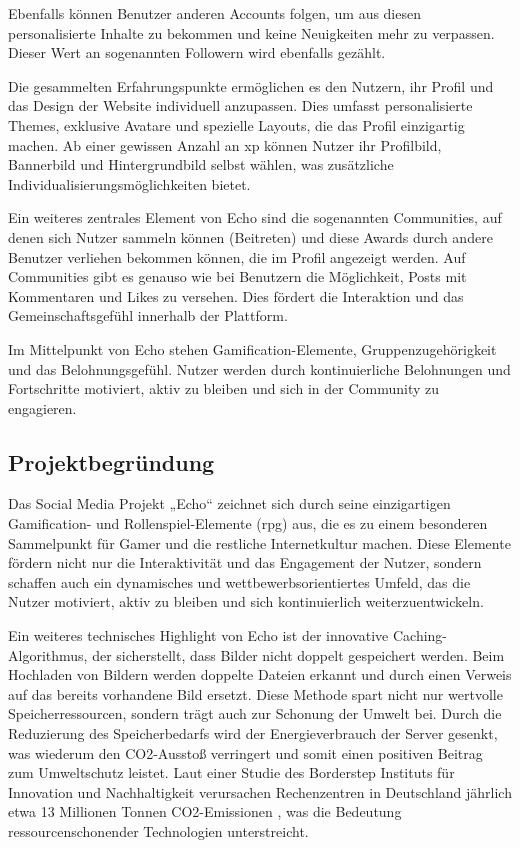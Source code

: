\documentclass[a4paper,12pt]{article}
\begin{document}
Ebenfalls können Benutzer anderen Accounts folgen, um aus diesen
personalisierte Inhalte zu bekommen und keine Neuigkeiten mehr zu verpassen.
Dieser Wert an sogenannten Followern wird ebenfalls gezählt.

Die gesammelten Erfahrungspunkte ermöglichen es den Nutzern, ihr Profil und das
Design der Website individuell anzupassen. Dies umfasst personalisierte Themes,
exklusive Avatare und spezielle Layouts, die das Profil einzigartig machen. Ab
einer gewissen Anzahl an \gls{xp} können Nutzer ihr Profilbild, Bannerbild und
Hintergrundbild selbst wählen, was zusätzliche Individualisierungsmöglichkeiten
bietet.

Ein weiteres zentrales Element von Echo sind die sogenannten Communities, auf
denen sich Nutzer sammeln können (Beitreten) und diese Awards durch andere
Benutzer verliehen bekommen können, die im Profil angezeigt werden. Auf
Communities gibt es genauso wie bei Benutzern die Möglichkeit, Posts mit
Kommentaren und Likes zu versehen. Dies fördert die Interaktion und das
Gemeinschaftsgefühl innerhalb der Plattform.

Im Mittelpunkt von Echo stehen Gamification-Elemente, Gruppenzugehörigkeit und
das Belohnungsgefühl. Nutzer werden durch kontinuierliche Belohnungen und
Fortschritte motiviert, aktiv zu bleiben und sich in der Community zu
engagieren.

\newpage
\subsection{Projektbegründung}
Das Social Media Projekt „Echo“ zeichnet sich durch seine einzigartigen
Gamification- und Rollenspiel-Elemente (\gls{rpg}) aus, die es zu einem
besonderen Sammelpunkt für Gamer und die restliche Internetkultur machen. Diese
Elemente fördern nicht nur die Interaktivität und das Engagement der Nutzer,
sondern schaffen auch ein dynamisches und wettbewerbsorientiertes Umfeld, das
die Nutzer motiviert, aktiv zu bleiben und sich kontinuierlich
weiterzuentwickeln.

Ein weiteres technisches Highlight von Echo ist der innovative
Caching-Algorithmus, der sicherstellt, dass Bilder nicht doppelt gespeichert
werden. Beim Hochladen von Bildern werden doppelte Dateien erkannt und durch
einen Verweis auf das bereits vorhandene Bild ersetzt. Diese Methode spart
nicht nur wertvolle Speicherressourcen, sondern trägt auch zur Schonung der
Umwelt bei. Durch die Reduzierung des Speicherbedarfs wird der Energieverbrauch
der Server gesenkt, was wiederum den CO2-Ausstoß verringert und somit einen
positiven Beitrag zum Umweltschutz leistet. Laut einer Studie des Borderstep
Instituts für Innovation und Nachhaltigkeit verursachen Rechenzentren in
Deutschland jährlich etwa 13 Millionen Tonnen CO2-Emissionen
\cite{borderstep2020}, was die Bedeutung ressourcenschonender Technologien
unterstreicht.
\end{document}
